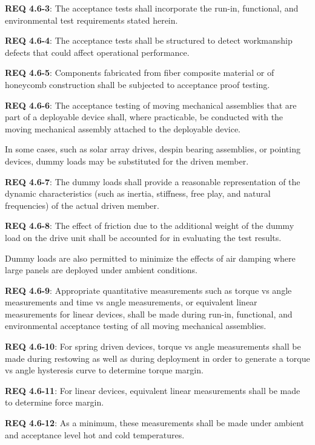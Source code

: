\documentclass[12pt]{article}
\begin{document}
\noindent \textbf{REQ 4.6-3}: The acceptance tests shall incorporate the run-in, functional, and environmental test requirements stated herein.

\noindent \textbf{REQ 4.6-4}: The acceptance tests shall be structured to detect workmanship defects that could affect operational performance. 

\noindent \textbf{REQ 4.6-5}: Components fabricated from fiber composite material or of honeycomb construction shall be subjected to acceptance proof testing. 

\noindent \textbf{REQ 4.6-6}: The acceptance testing of moving mechanical assemblies that are part of a deployable device shall, where practicable, be conducted with the moving mechanical assembly attached to the deployable device. 

In some cases, such as solar array drives, despin bearing assemblies, or pointing devices, dummy loads may be substituted for the driven member. 

\noindent \textbf{REQ 4.6-7}: The dummy loads shall provide a reasonable representation of the dynamic characteristics (such as inertia, stiffness, free play, and natural frequencies) of the actual driven member. 

\noindent \textbf{REQ 4.6-8}: The effect of friction due to the additional weight of the dummy load on the drive unit shall be accounted for in evaluating the test results. 

Dummy loads are also permitted to minimize the effects of air damping where large panels are deployed under ambient conditions. 

\noindent \textbf{REQ 4.6-9}: Appropriate quantitative measurements such as torque vs angle measurements and time vs angle measurements, or equivalent linear measurements for linear devices, shall be made during run-in, functional, and environmental acceptance testing of all moving mechanical assemblies. 

\noindent \textbf{REQ 4.6-10}: For spring driven devices, torque vs angle measurements shall be made during restowing as well as during deployment in order to generate a torque vs angle hysteresis curve to determine torque margin.

\noindent \textbf{REQ 4.6-11}: For linear devices, equivalent linear measurements shall be made to determine force margin. 

\noindent \textbf{REQ 4.6-12}: As a minimum, these measurements shall be made under ambient and acceptance level hot and cold temperatures. 
\end{document}
